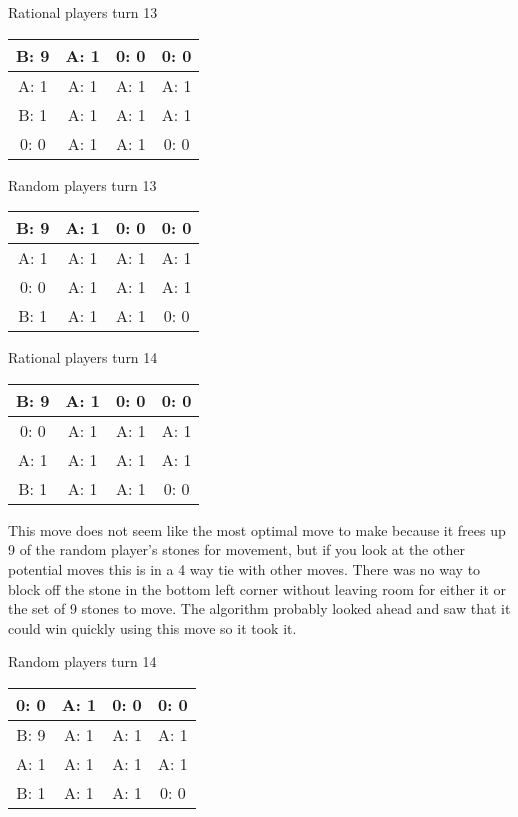 \documentclass[12pt]{article}
\begin{document}
Rational players turn 13
\begin{center}
\begin{tabular}{|c|c|c|c|}
\hline
B: 9  & A: 1  & 0: 0  & 0: 0  \\ \hline
A: 1  & A: 1  & A: 1  & A: 1  \\ \hline
B: 1  & A: 1  & A: 1  & A: 1  \\ \hline
0: 0  & A: 1  & A: 1  & 0: 0  \\ \hline
\end{tabular}
\end{center}
Random players turn 13
\begin{center}
\begin{tabular}{|c|c|c|c|}
\hline
B: 9  & A: 1  & 0: 0  & 0: 0  \\ \hline
A: 1  & A: 1  & A: 1  & A: 1  \\ \hline
0: 0  & A: 1  & A: 1  & A: 1  \\ \hline
B: 1  & A: 1  & A: 1  & 0: 0  \\ \hline
\end{tabular}
\end{center}

Rational players turn 14
\begin{center}
\begin{tabular}{|c|c|c|c|}
\hline
B: 9  & A: 1  & 0: 0  & 0: 0  \\ \hline
0: 0  & A: 1  & A: 1  & A: 1  \\ \hline
A: 1  & A: 1  & A: 1  & A: 1  \\ \hline
B: 1  & A: 1  & A: 1  & 0: 0  \\ \hline
\end{tabular}
\end{center}
This move does not seem like the most optimal move to make because it frees up 9 of the random player's stones for movement, but if you look at the other potential moves this is in a 4 way tie with other moves. There was no way to block off the stone in the bottom left corner without  leaving room for either it or the set of 9 stones to move. The algorithm probably looked ahead and saw that it could win quickly using this move so it took it.

Random players turn 14
\begin{center}
\begin{tabular}{|c|c|c|c|}
\hline
0: 0  & A: 1  & 0: 0  & 0: 0  \\ \hline
B: 9  & A: 1  & A: 1  & A: 1  \\ \hline
A: 1  & A: 1  & A: 1  & A: 1  \\ \hline
B: 1  & A: 1  & A: 1  & 0: 0  \\ \hline
\end{tabular}
\end{center}
\end{document}
